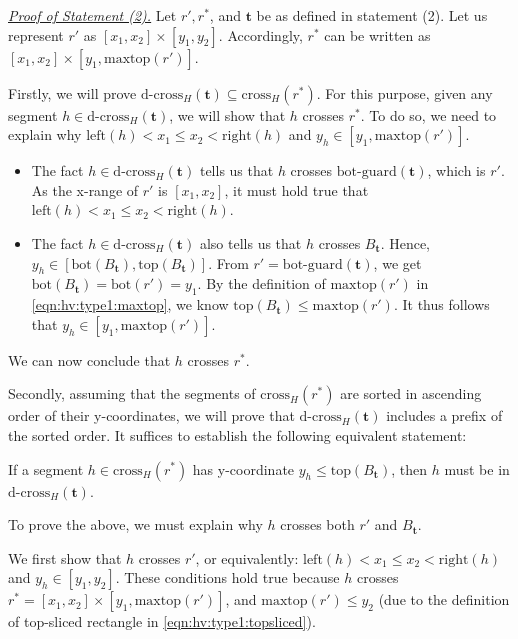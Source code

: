 \documentclass[acmsmall,review,anonymous]{acmart}
\def\vgap{\vspace{1mm}}
\def\extraspacing{\vspace{2mm} \noindent}
\def\xleft{\mathrm{left}}
\def\xright{\mathrm{right}}
\def\ybot{\mathrm{bot}}
\def\ytop{\mathrm{top}}
\def\maxtop{\mathrm{maxtop}}
\def\gbot{\mathrm{bot\text{-}guard}}
\def\cross{\mathrm{cross}}
\def\dcross{\mathrm{d\text{-}cross}}
\begin{document}
{{{\extraspacing \underline{\em Proof of Statement (2).} Let $r', r^*$, and $\bm{t}$ be as defined in statement (2). Let us represent $r'$ as $[x_1,x_2] \times [y_1, y_2]$. Accordingly, $r^*$ can be written as $[x_1, x_2] \times [y_1, \maxtop(r')]$.

\vgap

Firstly, we will prove $\dcross_H(\bm{t})\subseteq \cross_H(r^*)$. For this purpose, given any segment $h \in \dcross_H(\bm{t})$, we will show that $h$ crosses $r^*$. To do so, we need to explain why $\xleft(h) < x_1 \le x_2 < \xright(h)$ and $y_h \in [y_1, \maxtop(r')]$.
\begin{itemize}
    \item The fact $h \in \dcross_H(\bm{t})$ tells us that $h$ crosses $\gbot(\bm{t})$, which is $r'$. As the x-range of $r'$ is $[x_1,x_2]$, it must hold true that $\xleft(h) < x_1 \le x_2 < \xright(h)$.

    \vgap

    \item The fact $h \in \dcross_H(\bm{t})$ also tells us that $h$ crosses $B_{\bm{t}}$. Hence, $y_h \in [\ybot(B_\bm{t}), \ytop(B_{\bm{t}})]$. From $r' = \gbot(\bm{t})$, we get $\ybot(B_\bm{t}) = \ybot(r') = y_1$. By the definition of $\maxtop(r')$ in \eqref{eqn:hv:type1:maxtop}, we know $\ytop(B_{\bm{t}}) \leq \maxtop(r')$. It thus follows that $y_h \in [y_1, \maxtop(r')]$.
\end{itemize}
We can now conclude that $h$ crosses $r^*$.

\vgap

Secondly, assuming that the segments of $\cross_H(r^*)$ are sorted in ascending order of their y-coordinates,
we will prove that $\dcross_H(\bm{t})$ includes a prefix of the sorted order. It suffices to establish the following equivalent statement:

\vgap

 {
    If a segment $h \in \cross_H(r^*)$ has y-coordinate $y_h \le \ytop(B_{\bm{t}})$, then $h$ must be in $\dcross_H(\bm{t})$.
}

\vgap

\noindent To prove the above, we must explain why $h$ crosses both $r'$ and $B_{\bm{t}}$.

\vgap

We first show that $h$ crosses $r'$, or equivalently: $\xleft(h)  < x_1 \leq x_2 < \xright(h)$ and $y_h \in [y_1, y_2]$. These conditions hold true because $h$ crosses $r^* = [x_1,x_2]\times [y_1, \maxtop(r')]$, and $\maxtop(r')\leq y_2$ (due to the definition of top-sliced rectangle in \eqref{eqn:hv:type1:topsliced}).

}}}
\end{document}
